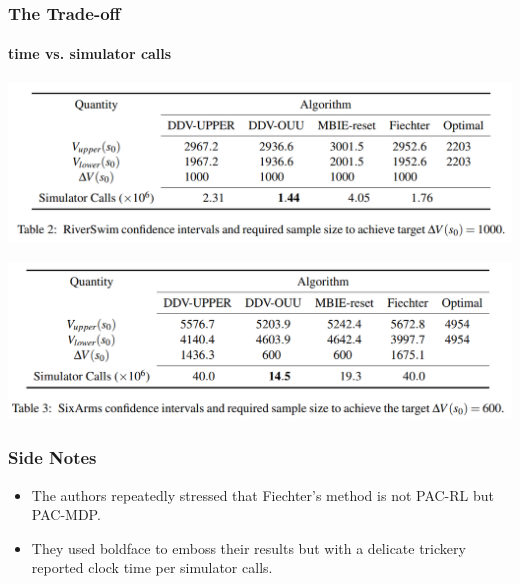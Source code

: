 \documentclass[11pt]{beamer}
\begin{document}
\begin{frame}
\frametitle{The Trade-off}
\framesubtitle{time vs. simulator calls}

\includegraphics[scale=0.2]{simcall-RiverSwim.png}

\includegraphics[scale=0.2]{simcall-SixArms.png}
\begin{table}
    \caption{Total clock time in seconds needed for execution of each algorithm}
    \label{tab:my_label}
\end{table}
    
\end{frame}

\begin{frame}
\frametitle{Side Notes}
\begin{itemize}
    \item The authors repeatedly stressed that Fiechter's method is not PAC-RL but PAC-MDP.
    \item They used boldface to emboss their results but with a delicate trickery reported clock time per simulator calls.
    
\end{itemize}
\end{frame}  
\end{document}
